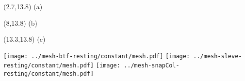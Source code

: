 \documentclass{article}
\begin{document}
\TPMargin{2pt}
\begin{textblock}{0.5}(2.7,13.8)
\normalsize
(a)
\end{textblock}
\begin{textblock}{1}(8,13.8)
\normalsize
(b)
\end{textblock}
\begin{textblock}{1}(13.3,13.8)
\normalsize
(c)
\end{textblock}
\texttt{[image: ../mesh-btf-resting/constant/mesh.pdf]}
\texttt{[image: ../mesh-sleve-resting/constant/mesh.pdf]}
\texttt{[image: ../mesh-snapCol-resting/constant/mesh.pdf]}
\end{document}
